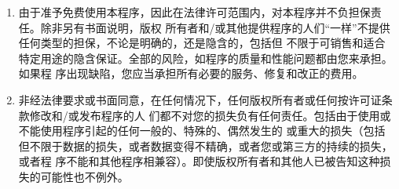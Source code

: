 \begin{enumerate}
        \addtocounter{enumi}{9}
    \item 由于准予免费使用本程序，因此在法律许可范围内，对本程序并不负担保责任。除非另有书面说明，版权 所有者和/或其他提供程序的人们``一样''不提供任何类型的担保，不论是明确的，还是隐含的，包括但 不限于可销售和适合特定用途的隐含保证。全部的风险，如程序的质量和性能问题都由您来承担。如果程 序出现缺陷，您应当承担所有必要的服务、修复和改正的费用。
    \item 非经法律要求或书面同意，在任何情况下，任何版权所有者或任何按许可证条款修改和/或发布程序的人 们都不对您的损失负有任何责任。包括由于使用或不能使用程序引起的任何一般的、特殊的、偶然发生的 或重大的损失（包括但不限于数据的损失，或者数据变得不精确，或者您或第三方的持续的损失，或者程 序不能和其他程序相兼容）。即使版权所有者和其他人已被告知这种损失的可能性也不例外。
\end{enumerate}


\providecommand{\LPPLsection}{\subsection}
\providecommand{\LPPLsubsection}{\subsubsection}
\providecommand{\LPPLsubsubsection}{\subsubsection}
\providecommand{\LPPLparagraph}{\paragraph}


